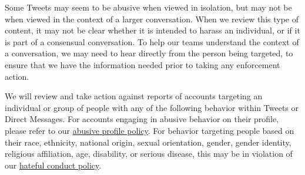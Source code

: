Some Tweets may seem to be abusive when viewed in isolation, but may not be when
viewed in the context of a larger conversation. When we review this type of
content, it may not be clear whether it is intended to harass an individual, or
if it is part of a consensual conversation. To help our teams understand the
context of a conversation, we may need to hear directly from the person being
targeted, to ensure that we have the information needed prior to taking any
enforcement action.

We will review and take action against reports of accounts targeting an
individual or group of people with any of the following behavior within Tweets
or Direct Messages. For accounts engaging in abusive behavior on their profile,
please refer to our
\href{https://web.archive.org/web/20220905021323/https://help.twitter.com/en/rules-and-policies/abusive-profile.html}{abusive
profile policy}. For behavior targeting people based on their race, ethnicity,
national origin, sexual orientation, gender, gender identity, religious
affiliation, age, disability, or serious disease, this may be in violation of
our
\href{https://web.archive.org/web/20220905021323/https://help.twitter.com/en/rules-and-policies/hateful-conduct-policy.html}{hateful
conduct policy}.

